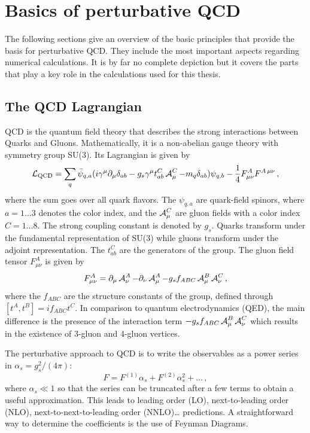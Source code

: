 
\chapter{Basics of perturbative QCD}
\label{ch:pqcd}
The following sections give an overview of the basic principles that provide the basis for perturbative QCD.
They include the most important aspects regarding numerical calculations.
It is by far no complete depiction but it covers the parts that play a key role in the calculations used for this thesis.
%
\section{The QCD Lagrangian}
QCD is the quantum field theory that describes the strong interactions between Quarks and Gluons.
Mathematically, it is a non-abelian gauge theory with symmetry group SU(3).
Its Lagrangian is given by
%
\begin{equation}
  \operatorname{\mathcal{L}}_\text{QCD} = \sum_q \bar\psi_{q,a} (i \gamma^\mu \partial_\mu \delta_{ab} - g_s \gamma^\mu t_{ab}^C \operatorname{\mathcal{A}}_\mu^C - m_q \delta_{ab}) \psi_{q,b} - \frac{1}{4} F_{\mu \nu}^A F^{A \, \mu \nu} \, ,
\end{equation}
%
where the sum goes over all quark flavors.
The $\psi_{q,a}$ are quark-field spinors, where $a=1 \dots 3$ denotes the color index, and the $\operatorname{\mathcal{A}}_\mu^C$ are gluon fields with a color index $C=1 \dots 8$.
The strong coupling constant is denoted by $g_s$.
Quarks transform under the fundamental representation of SU(3) while gluons transform under the adjoint representation.
The $t_{ab}^C$ are  the generators of the group.
The gluon field tensor $F_{\mu \nu}^A$ is given by
%
\begin{equation}
	F_{\mu \nu}^A = \partial_\mu \operatorname{\mathcal{A}}_\nu^A - \partial_\nu \operatorname{\mathcal{A}}_\mu^A - g_s f_{ABC} \operatorname{\mathcal{A}}_\mu^B \operatorname{\mathcal{A}}_\nu^C \, ,
\end{equation}
%
where the $f_{ABC}$ are the structure constants of the group, defined through $[ t^A,t^B ] = i f_{ABC} t^C$.
In comparison to quantum electrodynamics (QED), the main difference is the presence of the interaction term $- g_s f_{ABC} \operatorname{\mathcal{A}}_\mu^B \operatorname{\mathcal{A}}_\nu^C$ which results in the existence of 3-gluon and 4-gluon vertices.

The perturbative approach to QCD is to write the observables as a power series in $\alpha_s = g_s^2/(4 \pi)$:
%
\begin{equation}
  F = F^{(1)} \alpha_s + F^{(2)} \alpha_s^2 + \dots \, ,
\end{equation}
%
where $\alpha_s \ll 1$ so that the series can be truncated after a few terms to obtain a useful approximation.
This leads to leading order (LO), next-to-leading order (NLO), next-to-next-to-leading order (NNLO)\ldots{} predictions.
A straightforward way to determine the coefficients is the use of Feynman Diagrams.
%
